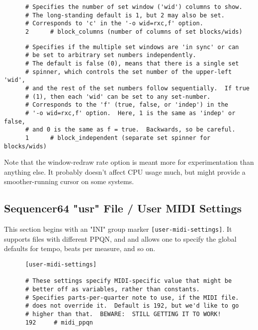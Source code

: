    \begin{verbatim}
      # Specifies the number of set window ('wid') columns to show.
      # The long-standing default is 1, but 2 may also be set.
      # Corresponds to 'c' in the '-o wid=rxc,f' option.
      2      # block_columns (number of columns of set blocks/wids)
   \end{verbatim}

   \begin{verbatim}
      # Specifies if the multiple set windows are 'in sync' or can
      # be set to arbitrary set numbers independently.
      # The default is false (0), means that there is a single set
      # spinner, which controls the set number of the upper-left 'wid',
      # and the rest of the set numbers follow sequentially.  If true
      # (1), then each 'wid' can be set to any set-number.
      # Corresponds to the 'f' (true, false, or 'indep') in the
      # '-o wid=rxc,f' option.  Here, 1 is the same as 'indep' or false,
      # and 0 is the same as f = true.  Backwards, so be careful.
      1      # block_independent (separate set spinner for blocks/wids)
   \end{verbatim}

   Note that the window-redraw rate option is meant more for experimentation
   than anything else.  It probably doesn't affect CPU usage much, but might
   provide a smoother-running cursor on some systems.

\subsection{Sequencer64 "usr" File / User MIDI Settings}
\label{subsec:seq64_usr_file_user_midi_settings}

   This section begins with an
   "INI" group marker \texttt{[user-midi-settings]}.
   It supports files with different PPQN, and and allows one to specify the
   global defaults for tempo, beats per measure, and so on.

   \begin{verbatim}
      [user-midi-settings]

      # These settings specify MIDI-specific value that might be
      # better off as variables, rather than constants.
      # Specifies parts-per-quarter note to use, if the MIDI file.
      # does not override it.  Default is 192, but we'd like to go
      # higher than that.  BEWARE:  STILL GETTING IT TO WORK!
      192     # midi_ppqn
   \end{verbatim}

